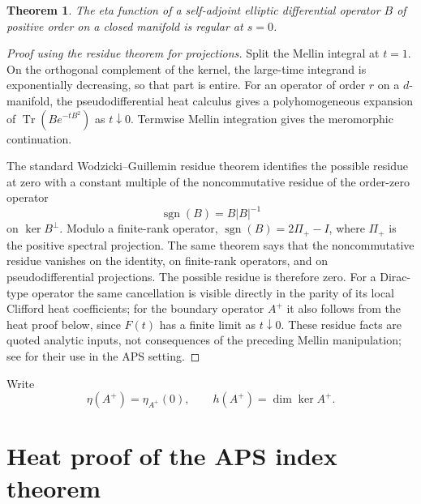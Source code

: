 \documentclass[12pt,oneside,reqno]{article}
\DeclareMathOperator{\Tr}{Tr}
\theoremstyle{plain}
\newtheorem{theorem}{Theorem}[section]
\theoremstyle{definition}
\theoremstyle{remark}
\begin{document}
\begin{theorem}\label{thm:eta-regular}
The eta function of a self-adjoint elliptic differential operator \(B\) of
positive order on a closed manifold is regular at \(s=0\).
\end{theorem}

\begin{proof}[Proof using the residue theorem for projections]
Split the Mellin integral at \(t=1\). On the orthogonal complement of the
kernel, the large-time integrand is exponentially decreasing, so that
part is entire. For an operator of order \(r\) on a \(d\)-manifold, the
pseudodifferential heat calculus gives a polyhomogeneous expansion of
\(\Tr(Be^{-tB^2})\) as \(t\downarrow0\). Termwise Mellin integration gives
the meromorphic continuation.

The standard Wodzicki--Guillemin residue theorem identifies the possible residue at zero with a constant multiple of the
noncommutative residue of the order-zero operator
\[
 \operatorname{sgn}(B)=B|B|^{-1}
\]
on \(\ker B^\perp\). Modulo a finite-rank operator,
\(\operatorname{sgn}(B)=2\Pi_+-I\), where \(\Pi_+\) is the positive spectral
projection. The same theorem says that the noncommutative residue vanishes on the identity, on
finite-rank operators, and on pseudodifferential projections. The possible
residue is therefore zero. For a Dirac-type operator the same cancellation
is visible directly in the parity of its local Clifford heat coefficients;
for the boundary operator \(A^+\) it also follows from the heat proof below,
since \(F(t)\) has a finite limit as \(t\downarrow0\).
These residue facts are quoted analytic inputs, not consequences of the
preceding Mellin manipulation; see \cite{Melrose} for their use in the APS
setting.
\end{proof}

Write
\[
 \eta(A^+)=\eta_{A^+}(0),\qquad h(A^+)=\dim\ker A^+.
\]

\section{Heat proof of the APS index theorem}
\label{sec:heat-proof}
\end{document}
